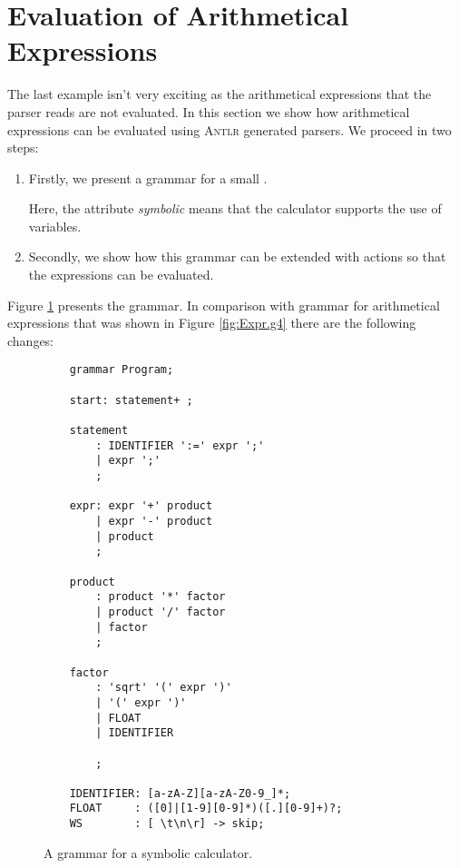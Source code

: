 \section{Evaluation of Arithmetical Expressions}
The last example isn't very exciting as the arithmetical expressions that the parser reads are not
evaluated.  In this section we show how arithmetical expressions can be evaluated using \textsc{Antlr}
generated parsers.  We proceed in two steps:
\begin{enumerate}
\item Firstly, we present a grammar for a small .

      Here, the attribute \emph{symbolic} means that the calculator supports the use of variables.
\item Secondly, we show how this grammar can be extended with actions so that the expressions can be evaluated.
\end{enumerate}
Figure \ref{fig:Program.g4} presents the grammar.  In comparison with grammar for arithmetical expressions that
was shown in Figure \ref{fig:Expr.g4} there are the following changes:

\begin{figure}[!ht]
\centering
\begin{verbatim}
    grammar Program;
    
    start: statement+ ; 
    
    statement
        : IDENTIFIER ':=' expr ';' 
        | expr ';'                 
        ;
    
    expr: expr '+' product 
        | expr '-' product 
        | product
        ;
    
    product 
        : product '*' factor 
        | product '/' factor 
        | factor
        ;
    
    factor
        : 'sqrt' '(' expr ')'
        | '(' expr ')'        
        | FLOAT               
        | IDENTIFIER          

        ;
    
    IDENTIFIER: [a-zA-Z][a-zA-Z0-9_]*;
    FLOAT     : ([0]|[1-9][0-9]*)([.][0-9]+)?;
    WS        : [ \t\n\r] -> skip; 
\end{verbatim}
\vspace*{-0.3cm}
\caption{A grammar for a symbolic calculator.}
\label{fig:Program.g4}
\end{figure}


